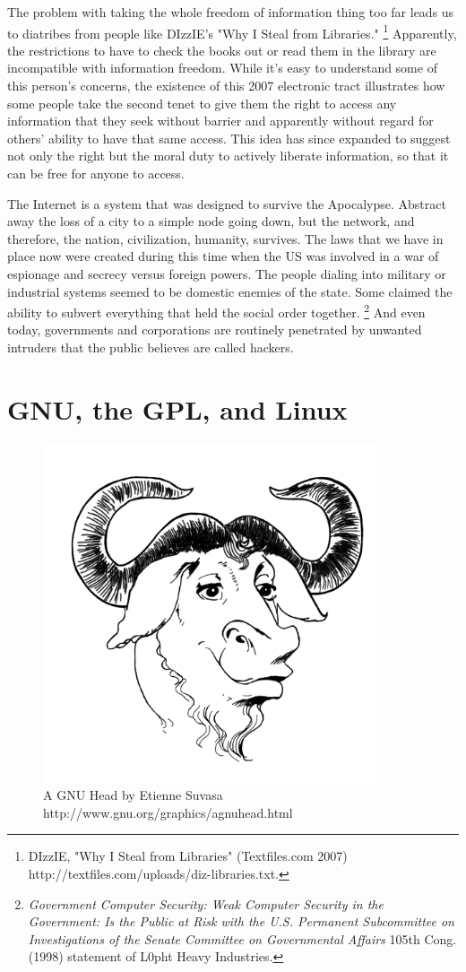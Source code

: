\documentclass[11pt]{article}
\begin{document}
The problem with taking the whole freedom of information thing too far leads us to diatribes from people like DIzzIE's "Why I Steal from Libraries."
\footnote{DIzzIE, "Why I Steal from Libraries" (Textfiles.com 2007) http://textfiles.com/uploads/diz-libraries.txt.} 
Apparently, the restrictions to have to check the books out or read them in the library are incompatible with information freedom. While it's easy to understand some of this person's concerns, the existence of this 2007 electronic tract illustrates how some people take the second tenet to give them the right to access any information that they seek without barrier and apparently without regard for others' ability to have that same access. This idea has since expanded to suggest not only the right but the moral duty to actively liberate information, so that it can be free for anyone to access.

The Internet is a system that was designed to survive the Apocalypse. Abstract away the loss of a city to a simple node going down, but the network, and therefore, the nation, civilization, humanity, survives. The laws that we have in place now were created during this time when the US was involved in a war of espionage and secrecy versus foreign powers. The people dialing into military or industrial systems seemed to be domestic enemies of the state. Some claimed the ability to subvert everything that held the social order together.
\footnote{\emph{Government Computer Security: Weak Computer Security in the Government: Is the Public at Risk with the U.S. Permanent Subcommittee on Investigations of the Senate Committee on Governmental Affairs} 105th Cong. (1998) statement of L0pht Heavy Industries.}
And even today, governments and corporations are routinely penetrated by unwanted intruders that the public believes are called hackers.

\newpage
\section{GNU, the GPL, and Linux}

\begin{figure}[ht!]
\center
\includegraphics[width=100mm]{gerwinski-gnu-head.png}
\caption{A GNU Head by Etienne Suvasa http://www.gnu.org/graphics/agnuhead.html}
\end{figure}
\end{document}
